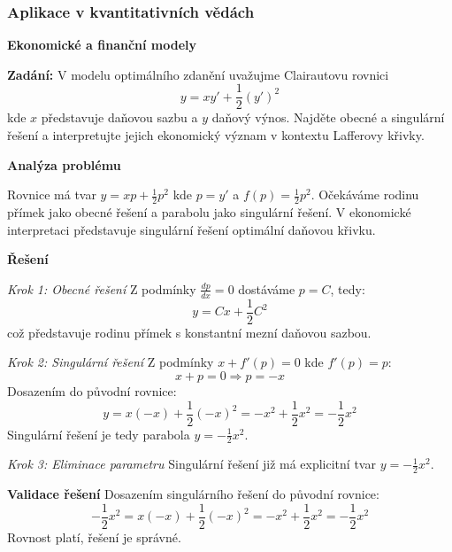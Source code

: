 \subsubsection{Aplikace v kvantitativních vědách}
\label{subsubsec:aplikace-kvantitativni}

\noindent\textbf{Ekonomické a finanční modely}

\begin{example}
\label{ex:laffer-krivka}

\noindent\textbf{Zadání:} V modelu optimálního zdanění uvažujme Clairautovu rovnici
\[
y = xy' + \frac{1}{2}(y')^2
\]
kde $x$ představuje daňovou sazbu a $y$ daňový výnos. Najděte obecné a singulární řešení a interpretujte jejich ekonomický význam v kontextu Lafferovy křivky.

\vspace{1.5\baselineskip}

\noindent\textbf{Analýza problému}

Rovnice má tvar $y = xp + \frac{1}{2}p^2$ kde $p = y'$ a $f(p) = \frac{1}{2}p^2$. Očekáváme rodinu přímek jako obecné řešení a parabolu jako singulární řešení. V ekonomické interpretaci představuje singulární řešení optimální daňovou křivku.

\vspace{1.5\baselineskip}

\noindent\textbf{Řešení}

\noindent\textit{Krok 1: Obecné řešení}
Z podmínky $\frac{dp}{dx} = 0$ dostáváme $p = C$, tedy:
\[
y = Cx + \frac{1}{2}C^2
\]
což představuje rodinu přímek s konstantní mezní daňovou sazbou.

\vspace{1\baselineskip}

\noindent\textit{Krok 2: Singulární řešení}
Z podmínky $x + f'(p) = 0$ kde $f'(p) = p$:
\[
x + p = 0 \Rightarrow p = -x
\]
Dosazením do původní rovnice:
\[
y = x(-x) + \frac{1}{2}(-x)^2 = -x^2 + \frac{1}{2}x^2 = -\frac{1}{2}x^2
\]
Singulární řešení je tedy parabola $y = -\frac{1}{2}x^2$.

\vspace{1\baselineskip}

\noindent\textit{Krok 3: Eliminace parametru}
Singulární řešení již má explicitní tvar $y = -\frac{1}{2}x^2$.

\vspace{1.5\baselineskip}

\noindent\textbf{Validace řešení}
Dosazením singulárního řešení do původní rovnice:
\[
-\frac{1}{2}x^2 = x(-x) + \frac{1}{2}(-x)^2 = -x^2 + \frac{1}{2}x^2 = -\frac{1}{2}x^2
\]
Rovnost platí, řešení je správné.


\end{example}
